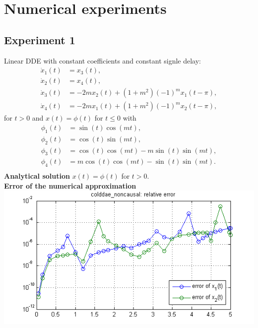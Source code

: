 \documentclass[final,reqno]{siamltex}
\begin{document}
\section{Numerical experiments}
\subsection{Experiment 1}Linear DDE with constant coefficients and constant signle delay:
\begin{equation}
\begin{aligned}
\dot{x}_1(t) & = x_3(t),\\
\dot{x}_2(t) & = x_4(t),\\
\dot{x}_3(t) & = -2mx_2(t)+(1+m^2)(-1)^mx_1(t-\pi),\\
\dot{x}_4(t) & = -2mx_1(t)+(1+m^2)(-1)^mx_2(t-\pi),
\end{aligned}
\end{equation}
for $t>0$ and $x(t)=\phi(t)$ for $t\leq 0$ with 
\begin{equation}
\begin{aligned}
{\phi}_1(t) & = \sin(t)\cos(mt),\\
{\phi}_2(t) & = \cos(t)\sin(mt),\\
{\phi}_3(t) & = \cos(t)\cos(mt)-m\sin(t)\sin(mt),\\
{\phi}_4(t) & =m\cos(t)\cos(mt)-\sin(t)\sin(mt).\\
\end{aligned}
\end{equation}
{\bf Analytical solution} \quad $x(t)=\phi(t)$ for $t>0$.\\

{\bf Error of the numerical approximation}\\
\includegraphics[width=\textwidth]{plot_dde149}
\end{document}
